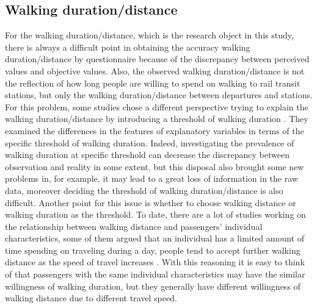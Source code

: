 \documentclass[sustainability,article,submit,moreauthors,pdftex,10pt,a4paper]{Definitions/mdpi}
\begin{document}
%
\subsection{Walking duration/distance}
%
For the walking duration/distance, which is the research object in this study, there is always a difficult point in obtaining the accuracy walking duration/distance by questionnaire because of the discrepancy between perceived values and objective values. Also, the observed walking duration/distance is not the reflection of how long people are willing to spend on walking to rail transit stations, but only the walking duration/distance between departures and stations. For this problem, some studies chose a different perspective trying to explain the walking duration/distance by introducing a threshold of walking duration \cite{besser2005walking,mccormack2008objective}. They examined the differences in the features of explanatory variables in terms of the specific threshold of walking duration. Indeed, investigating the prevalence of walking duration at specific threshold can decrease the discrepancy between observation and reality in some extent, but this disposal also brought some new problems in, for example, it may lead to a great loss of information in the raw data, moreover deciding the threshold of walking duration/distance is also difficult. Another point for this issue is whether to choose walking distance or walking duration as the threshold. To date, there are a lot of studies working on the relationship between walking distance and passengers' individual characteristics, some of them argued that an individual has a limited amount of time spending on traveling during a day, people tend to accept further walking distance as the speed of travel increases \cite{marchetti1994anthropological,larsen2010beyond}. With this reasoning it is easy to think of that passengers with the same individual characteristics may have the similar willingness of walking duration, but they generally have different willingness of walking distance due to different travel speed. 

%
\end{document}
